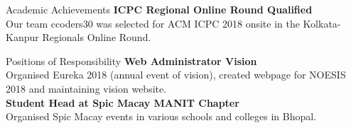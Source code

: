 \documentclass{resume} %
\begin{document}
\begin{rSection}{Academic Achievements}
{\bf ICPC Regional Online Round Qualified}
\\
Our team ccoders30 was selected for ACM ICPC 2018 onsite in the Kolkata-Kanpur Regionals
Online Round.
\end{rSection}


\begin{rSection}{Positions of Responsibility}
{\bf Web Administrator Vision}
\\
Organised Eureka 2018 (annual event of vision), created webpage for NOESIS 2018 and maintaining vision website.
\\
{\bf Student Head at Spic Macay MANIT Chapter}
\\
Organised Spic Macay events in various schools and colleges in Bhopal.
\end{rSection}
\end{document}
